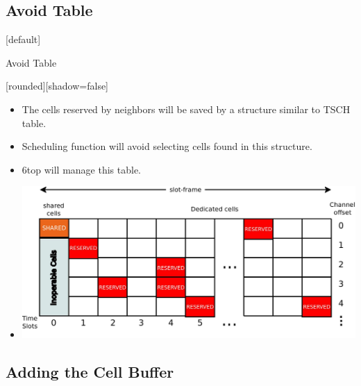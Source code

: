 \documentclass{beamer}
\makeatletter
\newenvironment{withoutheadline}{
        \setbeamertemplate{headline}[default]
        \def\beamer@entrycode{\vspace*{-\headheight}}
    }{}
\makeatother
\begin{document}
\subsection{Avoid Table}
\begin{withoutheadline}
\begin{frame}{Avoid Table}


[rounded][shadow=false]


\begin{block}

    \begin{itemize}

    \item The cells reserved by neighbors will be saved by a structure similar to TSCH table. 
    \item<2-> Scheduling function will avoid selecting cells found in this structure. 
    \item<3-> 6top will manage this table.
    \end{itemize}
    \end{block}

\centering
\begin{itemize}
\item[]
\begin{center}
\includegraphics[width=0.8\linewidth]{avoid.jpeg}

\end{center}
\end{itemize}




\end{frame}
\end{withoutheadline}

\subsection{Adding the Cell Buffer}
\end{document}
